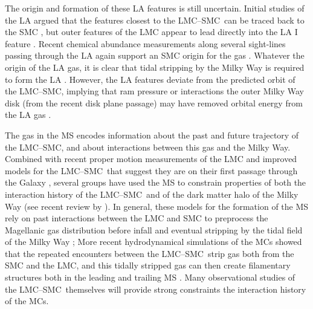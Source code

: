 \documentclass[twocolumn]{aastex62}
\newcommand{\lmcsmc}{LMC--SMC}
\begin{document}
The origin and formation of these LA features is still uncertain.
Initial studies of the LA argued that the features closest to the \lmcsmc\ can be traced back to the SMC \citep{Putman:1998}, but outer features of the LMC appear to lead directly into the LA I feature \citep{Nidever:2008}.
Recent chemical abundance measurements along several sight-lines passing through the LA again support an SMC origin for the gas \citep{Fox:2013, Fox:2018, Richter:2018}.
Whatever the origin of the LA gas, it is clear that tidal stripping by the Milky Way is required to form the LA \citep{Nidever:2008, Besla:2012}.
However, the LA features deviate from the predicted orbit of the \lmcsmc, implying that ram pressure or interactions the outer Milky Way disk (from the recent disk plane passage) may have removed orbital energy from the LA gas \citep[e.g.,][]{Bekki:2008}.

The gas in the MS encodes information about the past and future trajectory of the \lmcsmc, and about interactions between this gas and the Milky Way.
Combined with recent proper motion measurements of the LMC \citep{Kallivayalil:2006, Kallivayalil:2013} and improved models for the \lmcsmc\ that suggest they are on their first passage through the Galaxy \citep{Besla:2007, Besla:2010, Besla:2012}, several groups have used the MS to constrain properties of both the interaction history of the \lmcsmc\ and of the dark matter halo of the Milky Way (see recent review by \citealt{DOnghia:2016}).
In general, these models for the formation of the MS rely on past interactions between the LMC and SMC to preprocess the Magellanic gas distribution before infall and eventual stripping by the tidal field of the Milky Way \citep{Besla:2012, Diaz:2012};
More recent hydrodynamical simulations of the MCs showed that the repeated encounters between the \lmcsmc\ strip gas both from the SMC and the LMC, and this tidally stripped gas can then create filamentary structures both in the leading and trailing MS \citep{Pardy:2018}.
Many observational studies \citep[e.g.,][]{Olsen:2011, Noel:2013, Mackey:2016, Carrera:2017, Choi:2018a, Choi:2018b, Zivick:2018, Belokurov:2019} of the \lmcsmc\ themselves will provide strong constraints the interaction history of the MCs.
\end{document}
